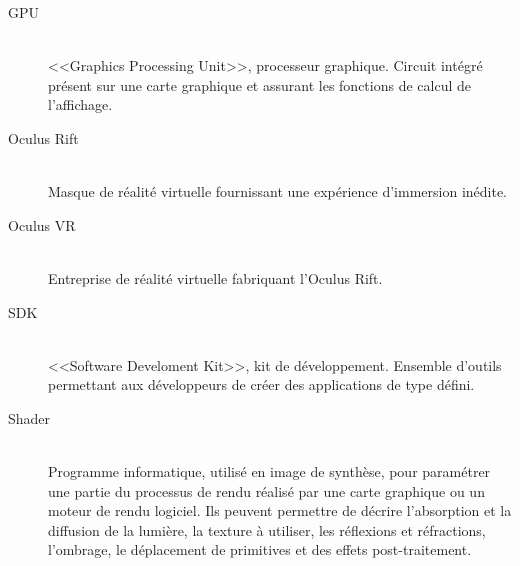 \documentclass[a4paper,french,12pt]{article}
\begin{document}
\begin{description}
		 \item [GPU]~\\
		    <<Graphics Processing Unit>>, processeur graphique.
		    Circuit intégré présent sur une carte graphique et assurant les fonctions de calcul de l'affichage.
		 
		 \item [Oculus Rift]~\\
		    Masque de réalité virtuelle fournissant une expérience d'immersion inédite.
		    
		 \item [Oculus VR]~\\
		    Entreprise de réalité virtuelle fabriquant l'Oculus Rift.
		    
		 
		 \item [SDK]~\\
		    <<Software Develoment Kit>>, kit de développement. 
		    Ensemble d'outils permettant aux développeurs de créer des applications de type défini.
		    
		 \item [Shader]~\\
		     Programme informatique, utilisé en image de synthèse, 
		     pour paramétrer une partie du processus de rendu réalisé par une carte graphique ou un moteur de rendu logiciel.
		     Ils peuvent permettre de décrire l'absorption et la diffusion de la lumière, la texture à utiliser, 
		     les réflexions et réfractions, l'ombrage, le déplacement de primitives 
		     et des effets post-traitement. 

		\end{description}

		
\end{document}
